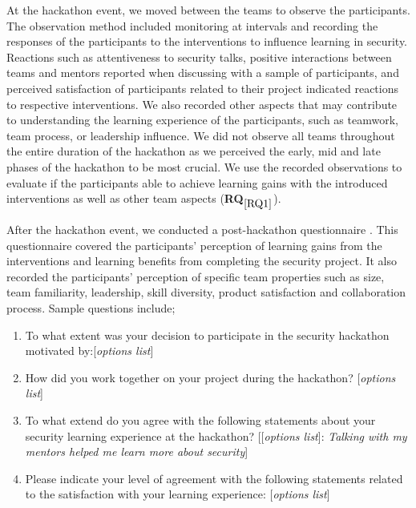 \documentclass[runningheads]{llncs}
\newcommand{\hr}[1]{\textbf{RQ}$_{\ref{#1}}$}
\begin{document}
At the hackathon event, we moved between the teams to observe the participants. The observation method included monitoring at intervals and recording the responses of the participants to the interventions to influence learning in security.
Reactions such as attentiveness to security talks, positive interactions between teams and mentors reported when discussing with a sample of participants, and perceived satisfaction of participants related to their project indicated reactions to respective interventions. We also recorded other aspects that may contribute to understanding the learning experience of the participants, such as teamwork, team process, or leadership influence.  
We did not observe all teams throughout the entire duration of the hackathon as we perceived the early, mid and late phases of the hackathon to be most crucial.
We use the recorded observations to evaluate if the participants able to achieve learning gains with the introduced interventions as well as other team aspects (\hr{RQ1}). 

After the hackathon event, we conducted a post-hackathon questionnaire \cite{van2015scrutinizing,filippova2017diversity,bhattacherjee2001understanding}. This questionnaire covered the participants' perception of learning gains from the interventions and learning benefits from completing the security project. It also recorded the participants' perception of specific team properties such as size, team familiarity, leadership, skill diversity, product satisfaction and collaboration process.
Sample questions include; 
\begin{enumerate}
    \item To what extent was your decision to participate in the security hackathon motivated by:[\textit{options list}]
    \item How did you work together on your project during the hackathon? [\textit{options list}]
    \item To what extend do you agree with the following statements about your security learning experience at the hackathon? [[\textit{options list}]: \textit{Talking with my mentors helped me learn more about security}]
    \item Please indicate your level of agreement with the following statements related to the satisfaction with your learning experience: [\textit{options list}]
\end{enumerate}
\end{document}
